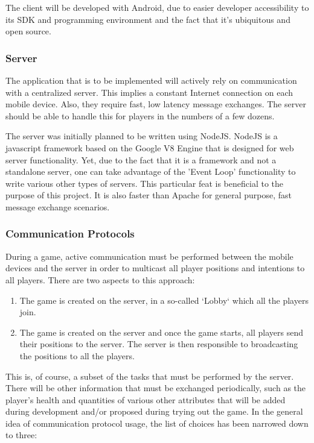 \documentclass{article}
\begin{document}
The client will be developed with Android, due to easier developer
accessibility to its SDK and programming environment and the fact that it's
ubiquitous and open source.\newline

\subsubsection{Server}
The application that is to be implemented will actively rely on communication
with a centralized server. This implies a constant Internet connection on each
mobile device. Also, they require fast, low latency message exchanges. The
server should be able to handle this for players in the numbers of a few
dozens.\newline

The server was initially planned to be written using NodeJS\cite{nodejs}. NodeJS
is a javascript framework based on the Google V8 Engine that is designed for web
server functionality. Yet, due to the fact that it is a framework and not a
standalone server, one can take advantage of the 'Event Loop' functionality to
write various other types of servers. This particular feat is beneficial to the
purpose of this project. It is also faster than Apache for general purpose, fast
message exchange scenarios\cite{nodejsvsapache}.

\subsubsection{Communication Protocols}
During a game, active communication must be performed between the mobile devices
and the server in order to multicast all player positions and intentions to all
players. There are two aspects to this approach:

\begin{enumerate}
	\item The game is created on the server, in a so-called `Lobby` which all the
	players join.
	\item The game is created on the server and once the game starts, all players send
	their positions to the server. The server is then responsible to broadcasting
	the positions to all the players.
\end{enumerate}

This is, of course, a subset of the tasks that must be performed by the server.
There will be other information that must be exchanged periodically, such as the
player's health and quantities of various other attributes that will be added
during development and/or proposed during trying out the game. In the general
idea of communication protocol usage, the list of choices has been narrowed down
to three:
\end{document}
